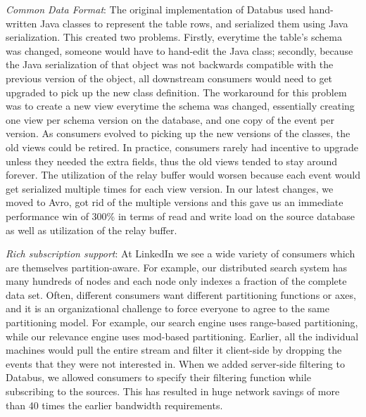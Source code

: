 \begin{itemize*}
\item \emph{Common Data Format}: The original implementation of Databus used hand-written Java classes to represent the table rows, and serialized them using Java serialization. This created two problems. Firstly, everytime the table's schema was changed, someone would have to hand-edit the Java class; secondly, because the Java serialization of that object was not backwards compatible with the previous version of the object, all downstream consumers would need to get upgraded to pick up the new class definition. The workaround for this problem was to create a new view everytime the schema was changed, essentially creating one view per schema version on the database, and one copy of the event per version. As consumers evolved to picking up the new versions of the classes, the old views could be retired. In practice, consumers rarely had incentive to upgrade unless they needed the extra fields, thus the old views tended to stay around forever. The utilization of the relay buffer would worsen because each event would get serialized multiple times for each view version. In our latest changes, we moved to Avro, got rid of the multiple versions and this gave us an immediate performance win of 300\% in terms of read and write load on the source database as well as utilization of the relay buffer. 
\item \emph{Rich subscription support}: At LinkedIn we see a wide variety of consumers which are themselves partition-aware. For example, our distributed search system has many hundreds of nodes and each node only indexes a fraction of the complete data set. 
Often, different consumers want different partitioning functions or axes, and it is an organizational challenge to force everyone to agree to the same partitioning model. For example, our search engine
 uses range-based partitioning, while our relevance engine uses mod-based partitioning. Earlier, all the individual machines would pull the entire stream and filter it client-side by dropping the events that they were not interested in. When we added server-side filtering to Databus, we allowed consumers to specify their filtering function while subscribing to the sources. This has resulted in huge network savings of more than 40 times the earlier bandwidth requirements.
\end{itemize*}

